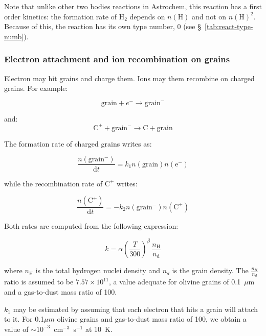 \documentclass[a4paper,12pt]{article}
\newcommand{\conc}[1]{n(\mathrm{#1})}
\begin{document}
{Note that unlike other two bodies reactions in Astrochem, this
reaction has a first order kinetics: the formation rate of H$_{2}$
depends on $\conc{H}$ and not on $\conc{H}^{2}$. Because of this, the
reaction has its own type number, 0 (see
\S~\ref{tab:react-type-numb}).

\subsubsection{Electron attachment and ion recombination on grains}
\label{sec:electr-attachm-ion}

Electron may hit grains and charge them. Ions may them recombine on
charged grains. For example:

\begin{equation}
  \mathrm{grain} + e^{-} \rightarrow \mathrm{grain}^{-}
\end{equation}

\noindent
and:
\begin{equation}
  \mathrm{C^{+}} + \mathrm{grain}^{-} \rightarrow \mathrm{C} + \mathrm{grain}
\end{equation}
 
The formation rate of charged grains writes as:

\begin{equation}
  \frac{\conc{grain^{-}}}{\mathrm{d}t} = k_{1} \conc{grain} \conc{e^{-}}
\end{equation}

\noindent
while the recombination rate of $\mathrm{C^{+}}$ writes:

\begin{equation}
  \frac{\conc{C^{+}}}{\mathrm{d}t} = - k_{2} \conc{grain^{-}} \conc{C^{+}}
\end{equation}

Both rates are computed from the following expression:

\begin{equation}
  k = \alpha \left( \frac{T}{300} \right)^\beta \, \frac{n_\mathrm{H}}{n_\mathrm{d}}
  \label{eq:grain-attach-neutralization}
\end{equation}

\noindent where $n_\mathrm{H}$ is the total hydrogen nuclei density
and $n_{d}$ is the grain density. The $\frac{n_{H}}{n_{d}}$ ratio is
assumed to be $7.57 \times 10^{11}$, a value adequate for olivine
grains of 0.1~$\mu$m and a gas-to-dust mass ratio of 100.

$k_{1}$ may be estimated by assuming that each electron that hits a
grain will attach to it. For 0.1$\mu m$ olivine grains and gas-to-dust
mass ratio of 100, we obtain a value of $\sim
10^{-3}$~cm$^{-3}$~s$^{-1}$ at 10~K.

}
\end{document}
